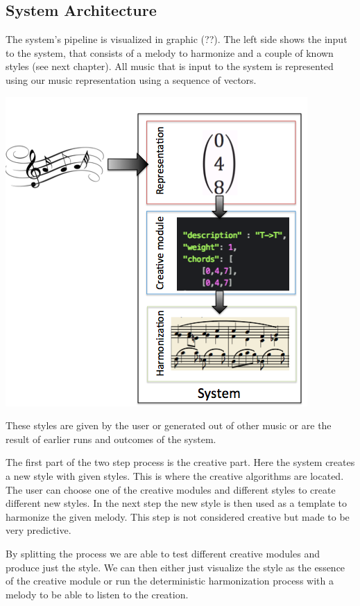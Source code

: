 \subsection{System Architecture}
The system's pipeline is visualized in graphic (??). The left side shows the input to the system, that consists of a melody to harmonize and a couple of known styles (see next chapter). All music that is input to the system is represented using our music representation using a sequence of vectors.

\includegraphics[scale=1]{Chapters/pic/sys_arch.png}

These styles are given by the user or generated out of other music or are the result of earlier runs and outcomes of the system.

The first part of the two step process is the creative part. Here the system creates a new style with given styles. This is where the creative algorithms are located. The user can choose one of the creative modules and different styles to create different new styles. In the next step the new style is then used as a template to harmonize the given melody. This step is not considered creative but made to be very predictive.

By splitting the process we are able to test different creative modules and produce just the style. We can then either just visualize the style as the essence of the creative module or run the deterministic harmonization process with a melody to be able to listen to the creation. 
